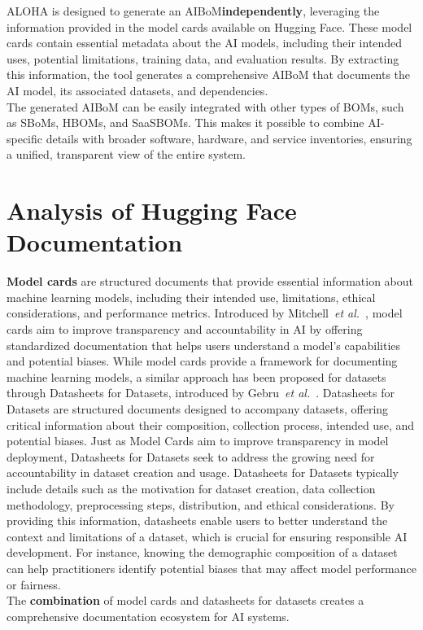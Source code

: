 \documentclass[12pt,a4paper, oneside, openright]{book}
\newcommand{\aibom}{{AIBoM}\xspace}
\newcommand{\sboms}{{SBoMs}\xspace}
\newcommand{\etal}{\textit{et al.}\xspace}
\begin{document}
ALOHA is designed to generate an \aibom \textbf{independently}, leveraging the information provided in the model cards available on Hugging Face. These model cards contain essential metadata about the AI models, including their intended uses, potential limitations, training data, and evaluation results. By extracting this information, the tool generates a comprehensive \aibom that documents the AI model, its associated datasets, and dependencies.\\
The generated \aibom can be easily integrated with other types of BOMs, such as \sboms, HBOMs, and SaaSBOMs. This makes it possible to combine AI-specific details with broader software, hardware, and service inventories, ensuring a unified, transparent view of the entire system. 
\section{Analysis of Hugging Face Documentation}
\textbf{Model cards} are structured documents that provide essential information about machine learning models, including their intended use, limitations, ethical considerations, and performance metrics. Introduced by Mitchell~\etal~\cite{Model_Cards_for}, model cards aim to improve transparency and accountability in AI by offering standardized documentation that helps users understand a model’s capabilities and potential biases.
While model cards provide a framework for documenting machine learning models, a similar approach has been proposed for datasets through Datasheets for Datasets, introduced by Gebru~\etal~\cite{gebru2021datasheetsdatasets}. Datasheets for Datasets are structured documents designed to accompany datasets, offering critical information about their composition, collection process, intended use, and potential biases. Just as Model Cards aim to improve transparency in model deployment, Datasheets for Datasets seek to address the growing need for accountability in dataset creation and usage.
Datasheets for Datasets typically include details such as the motivation for dataset creation, data collection methodology, preprocessing steps, distribution, and ethical considerations. By providing this information, datasheets enable users to better understand the context and limitations of a dataset, which is crucial for ensuring responsible AI development. For instance, knowing the demographic composition of a dataset can help practitioners identify potential biases that may affect model performance or fairness.\\
The \textbf{combination} of model cards and datasheets for datasets creates a comprehensive documentation ecosystem for AI systems.\\
\end{document}
